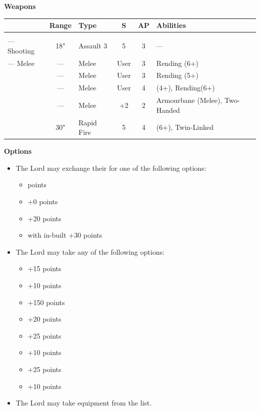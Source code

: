 \begin{minipage}[t]{0.72\textwidth}
	\vspace*{2em}
	\textbf{Weapons}
	
	\begin{tabular}{m{90 pt} c C{40pt} *{2}{c} >{\raggedright\arraybackslash}p{130pt}}
		& Range & Type & S & AP & Abilities \\
		\hline
		 & & &  &  &  \\
		— Shooting & 18" & Assault 3 & 5 & 3 & — \\
		— Melee & — & Melee & User & 3 & Rending (6+) \\
		 & — & Melee & User & 3 & Rending (5+) \\
		 & — & Melee & User & 4 &  (4+), Rending(6+) \\
		 & — & Melee & +2 & 2 & Armourbane (Melee), Two-Handed \\
		 & 30" & Rapid Fire & 5 & 4 &  (6+), Twin-Linked \\	
	\end{tabular}
	
	\vspace*{2em}
	\textbf{Options}
	\begin{itemize}
		\item The Lord may exchange their  for one of the following options:
		\begin{itemize}			
			\item {}  points
			\item {} \dotfill +0 points
			\item {} \dotfill +20 points
			\item {} with in-built  \dotfill +30 points
		\end{itemize}
		\item The Lord may take any of the following options:
		\begin{itemize}
			\item {} \dotfill +15 points
			\item {} \dotfill +10 points
			\item {} \dotfill +150 points
			\item {} \dotfill +20 points
			\item {} \dotfill +25 points
			\item {} \dotfill +10 points
			\item {} \dotfill +25 points
			\item {} \dotfill +10 points
		\end{itemize}
		\item The Lord may take equipment from the  list.
	\end{itemize}
\end{minipage}

